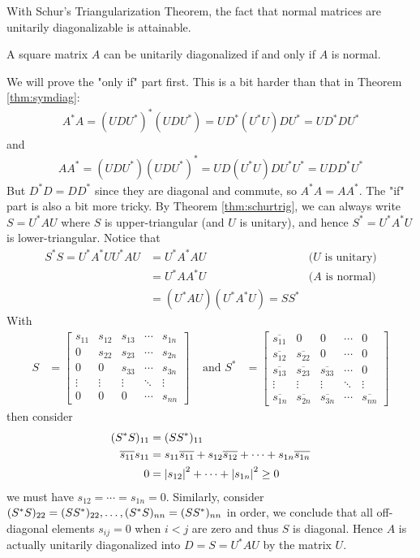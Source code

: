 With Schur's Triangularization Theorem, the fact that normal matrices are unitarily diagonalizable is attainable.
\begin{thm}
\label{thm:normalunidiag}
A square matrix $A$ can be unitarily diagonalized if and only if $A$ is normal.
\end{thm}
We will prove the "only if" part first. This is a bit harder than that in Theorem \ref{thm:symdiag}:
\begin{align*}
A^*A = (UDU^*)^*(UDU^*) = UD^*(U^*U) DU^* = UD^*DU^* 
\end{align*}
and
\begin{align*}
AA^* = (UDU^*)(UDU^*)^* = UD(U^*U) DU^*U^* = UDD^*U^*  
\end{align*}
But $D^*D = DD^*$ since they are diagonal and commute, so $A^*A = AA^*$. The "if" part is also a bit more tricky. By Theorem \ref{thm:schurtrig}, we can always write $S = U^*AU$ where $S$ is upper-triangular (and $U$ is unitary), and hence $S^* = U^*A^*U$ is lower-triangular. Notice that
\begin{align*}
S^*S = U^*A^*U U^*AU &= U^*A^* AU &\text{($U$ is unitary)} \\
&= U^*AA^*U &\text{($A$ is normal)} \\
&= (U^*AU) (U^*A^*U) = SS^*
\end{align*}
With
\begin{align*}
S &= 
\begin{bmatrix}
s_{11} & s_{12} & s_{13} & \cdots & s_{1n} \\
0 & s_{22} & s_{23} & \cdots & s_{2n} \\
0 & 0 & s_{33} & \cdots & s_{3n} \\
\vdots & \vdots & \vdots & \ddots & \vdots \\
0 & 0 & 0 & \cdots & s_{nn}
\end{bmatrix}
& \text{ and } 
S^* &= 
\begin{bmatrix}
\overline{s_{11}} & 0 & 0 & \cdots & 0 \\
\overline{s_{12}} & \overline{s_{22}} & 0 & \cdots & 0 \\
\overline{s_{13}} & \overline{s_{23}} & \overline{s_{33}} & \cdots & 0 \\
\vdots & \vdots & \vdots & \ddots & \vdots \\
\overline{s_{1n}} & \overline{s_{2n}} & \overline{s_{3n}} & \cdots & \overline{s_{nn}}
\end{bmatrix}
\end{align*}
then consider
\begin{align*}
(S^*S)_{11} &= (SS^*)_{11} \\
\overline{s_{11}}s_{11} &= s_{11}\overline{s_{11}} + s_{12}\overline{s_{12}} + \cdots + s_{1n}\overline{s_{1n}} \\
0 &= \abs{s_{12}}^2 + \cdots + \abs{s_{1n}}^2 \geq 0
\end{align*}
we must have $s_{12} = \cdots = s_{1n} = 0$. Similarly, consider $(S^*S)_{22} = (SS^*)_{22}, \ldots, \\ (S^*S)_{nn} = (SS^*)_{nn}$ in order, we conclude that all off-diagonal elements $s_{ij} = 0$ when $i < j$ are zero and thus $S$ is diagonal. Hence $A$ is actually unitarily diagonalized into $D = S = U^*AU$ by the matrix $U$.

